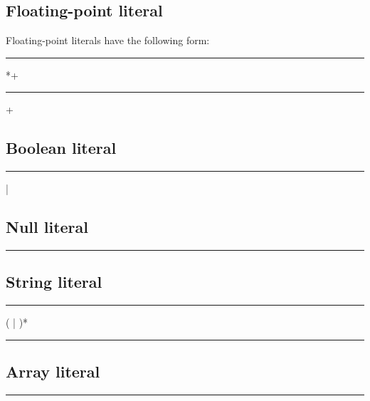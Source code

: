 \subsection{Floating-point literal}

Floating-point literals have the following form:

\begin{grammar}
    \rule{floating-point-literal}  *+\\
    \rule{floating-point-literal} +
\end{grammar}

\subsection{Boolean literal}

\begin{grammar}
    \rule{boolean-literal}  | 
\end{grammar}

\subsection{Null literal}

\begin{grammar}
    \rule{null-literal} 
\end{grammar}

\subsection{String literal}

\begin{grammar}
    \rule{string-literal} ( | )*\\
    \rule{interpolated-expression} \code{\$\{}  \code{\}}
\end{grammar}

\subsection{Array literal}

\begin{grammar}
\rule{array-literal} \code{[}  \code{]}
\end{grammar}

